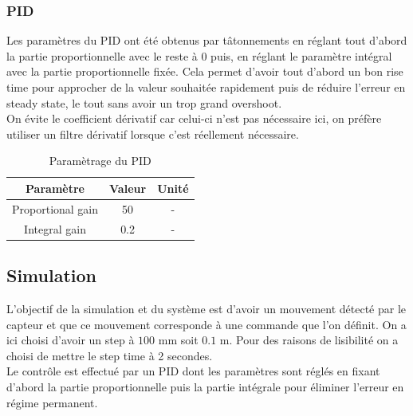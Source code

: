 \documentclass[a4paper,12pt,calibri,oneside,openany]{book}
\theoremstyle{break}
\begin{document}
\subsubsection{PID}
Les paramètres du PID ont été obtenus par tâtonnements en réglant tout d'abord la partie proportionnelle avec le reste à 0 puis, en réglant le paramètre intégral avec la partie proportionnelle fixée. Cela permet d'avoir tout d'abord un bon rise time pour approcher de la valeur souhaitée rapidement puis de réduire l'erreur en steady state, le tout sans avoir un trop grand overshoot.\\

On évite le coefficient dérivatif car celui-ci n'est pas nécessaire ici, on préfère utiliser un filtre dérivatif lorsque c'est réellement nécessaire.
\begin{table}[H]
	\centering
	\begin{tabular}{|c|c|c|}
		\hline
		\cellcolor{gray!30}Paramètre & \cellcolor{gray!30}Valeur & \cellcolor{gray!30}Unité\\
		\hline
		Proportional gain & 50 & - \\
		\hline
		Integral gain & 0.2 & -\\
		\hline
	\end{tabular}
	\caption{Paramètrage du PID}
\end{table}
\subsection{Simulation}
L'objectif de la simulation et du système est d'avoir un mouvement détecté par le capteur et que ce mouvement corresponde à une commande que l'on définit. On a ici choisi d'avoir un step à $100$ mm soit $0.1$ m. Pour des raisons de lisibilité on a choisi de mettre le step time à 2 secondes.\\

Le contrôle est effectué par un PID dont les paramètres sont réglés en fixant d'abord la partie proportionnelle puis la partie intégrale pour éliminer l'erreur en régime permanent. \\
\end{document}
